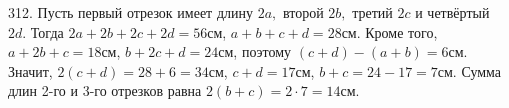 312. Пусть первый отрезок имеет длину $2a,$ второй $2b,$ третий $2c$ и четвёртый $2d.$ Тогда $2a+2b+2c+2d=56$см, $a+b+c+d=28$см. Кроме того, $a+2b+c=18$см, $b+2c+d=24$см, поэтому $(c+d)-(a+b)=6$см. Значит, $2(c+d)=28+6=34$см, $c+d=17$см, $b+c=24-17=7$см. Сумма длин 2-го и 3-го отрезков равна $2(b+c)=2\cdot7=14$см.\\
